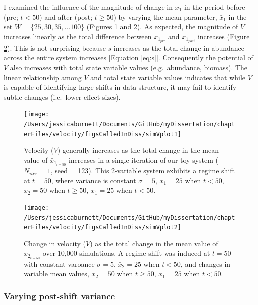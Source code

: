 \documentclass[12pt,twoside,openany]{reedthesis}
\begin{document}
I examined the influence of the magnitude of change in \(x_1\) in the period before (pre; \(t <50\)) and after (post; \(t \geq 50\)) by varying the mean parameter, \(\bar{x}_1\) in the set \(W=\{25,30,35,...100 \}\) (Figures \ref{fig:simVplot1} and \ref{fig:simVplot2}). As expected, the magnitude of \(V\) increases linearly as the total difference between \(\bar{x}_{1_{pre}}\) and \(\bar{x}_{1_{post}}\) increases (Figure \ref{fig:simVplot2}). This is not surprising because \(s\) increases as the total change in abundance across the entire system increases {[}Equation \eqref{eq:s}{]}. Consequently the potential of \(V\) also increases with total state variable values (e.g.~abundance, biomass). The linear relationship among \(V\) and total state variable values indicates that while \(V\) is capable of identifying large shifts in data structure, it may fail to identify subtle changes (i.e.~lower effect sizes).
\begin{figure}
\texttt{[image: /Users/jessicaburnett/Documents/GitHub/myDissertation/chapterFiles/velocity/figsCalledInDiss/simVplot1]} \caption{Velocity ($V$) generally increases as the total change in the mean value of $\bar{x}_{1_{t=50}}$ increases in a single iteration of our toy system ($N_{iter}=1$, seed = 123). This 2-variable system exhibits a regime shift at $t=50$, where variance is constant $\sigma = 5$, $\bar{x}_1 = 25$ when $t<50$,  $\bar{x}_2=50$ when $t\geq50$, $\bar{x}_1 = 25$ when $t <50$.}\label{fig:simVplot1}
\end{figure}
\begin{figure}
\texttt{[image: /Users/jessicaburnett/Documents/GitHub/myDissertation/chapterFiles/velocity/figsCalledInDiss/simVplot2]} \caption{Change in velocity ($V$) as the total change in the mean value of $\bar{x}_{2_{t=50}}$ over 10,000 simulations. A regime shift was induced at $t=50$ with constant varoance $\sigma = 5$, $\bar{x}_2 = 25$ when $t<50$,  and changes in variable mean values, $\bar{x}_2 = 50$ when $t \geq 50$, $\bar{x}_1 = 25$ when $t<50$.}\label{fig:simVplot2}
\end{figure}
\hypertarget{varying-post-shift-variance}{%
\subsubsection{Varying post-shift variance}\label{varying-post-shift-variance}}
\end{document}
